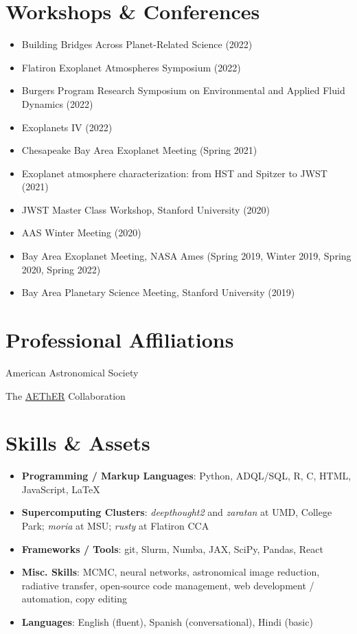 \documentclass[letterpaper,10.5pt]{article}
\newcommand{\resumeItem}[2]{
  \item\small{
    \textbf{#1}{#2 \vspace{-2pt}}
  }
}
\newcommand{\resumeSubHeadingListStart}{\begin{itemize}[leftmargin=*]}
\newcommand{\resumeSubHeadingListEnd}{\end{itemize}}
\newcommand{\resumeItemListStart}{\begin{itemize}}
\newcommand{\resumeItemListEnd}{\end{itemize}\vspace{-5pt}}
\newcommand{\shorterSection}[1]{\vspace{-10pt}\section{#1}}
\begin{document}
\shorterSection{Workshops \& Conferences}
\resumeItemListStart
\resumeItem{}{Building Bridges Across Planet-Related Science (2022)}
\resumeItem{}{Flatiron Exoplanet Atmospheres Symposium (2022)}
\resumeItem{}{Burgers Program Research
Symposium on Environmental and Applied Fluid Dynamics (2022)}
\resumeItem{}{Exoplanets IV (2022)}
\resumeItem{}{Chesapeake Bay Area Exoplanet Meeting (Spring 2021)}
\resumeItem{}{Exoplanet atmosphere characterization: from HST and Spitzer to JWST (2021)}
\resumeItem{}{JWST Master Class Workshop, Stanford University (2020)}
\resumeItem{}{AAS Winter Meeting (2020)}
\resumeItem{}{Bay Area Exoplanet Meeting, NASA Ames (Spring 2019, Winter 2019, Spring 2020, Spring 2022)}
\resumeItem{}{Bay Area Planetary Science Meeting, Stanford University (2019)}
\resumeItemListEnd

\shorterSection{Professional Affiliations}
\small
  \begin{list}{}{\cvlist}
  \item[{\color{numcolor}}]American Astronomical Society
  \item[{\color{numcolor}}]The \href{https://planets.carnegiescience.edu/}{AEThER} Collaboration



  \end{list}


\shorterSection{Skills \& Assets}
  \resumeSubHeadingListStart
  \small
    \item{
     \textbf{Programming / Markup Languages}{: Python, ADQL/SQL, R, C, HTML, JavaScript, \LaTeX}
    }
    \vspace{-5pt}
    \item{
     \textbf{Supercomputing Clusters}{: \textit{deepthought2} and \textit{zaratan} at UMD, College Park; \textit{moria} at MSU; \textit{rusty} at Flatiron CCA}
    }
    \vspace{-5pt}
    \item{
     \textbf{Frameworks / Tools}{: git, Slurm, Numba, JAX, SciPy, Pandas, React}
    }
    \vspace{-5pt}
    \item{
     \textbf{Misc. Skills}{: MCMC, neural networks, astronomical image reduction, radiative transfer, open-source code management, web development / automation, copy editing}
    }
    \vspace{-5pt}
    \item{
     \textbf{Languages}{: English (fluent), Spanish (conversational), Hindi (basic)}
    }
\resumeSubHeadingListEnd
\end{document}
